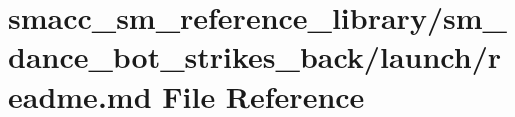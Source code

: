 \hypertarget{smacc__sm__reference__library_2sm__dance__bot__strikes__back_2launch_2readme_8md}{}\section{smacc\+\_\+sm\+\_\+reference\+\_\+library/sm\+\_\+dance\+\_\+bot\+\_\+strikes\+\_\+back/launch/readme.md File Reference}
\label{smacc__sm__reference__library_2sm__dance__bot__strikes__back_2launch_2readme_8md}
